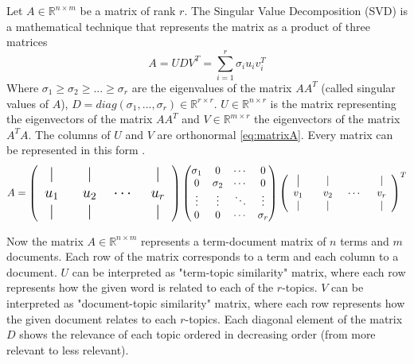 \documentclass[a4paper,11pt,DIV=15]{scrartcl} %
\theoremstyle{plain}
\theoremstyle{definition}
\begin{document}
Let $A \in \mathbb{R}^{n \times m}$ be a matrix of rank $r$. The Singular Value Decomposition (SVD) is a mathematical technique that represents the matrix as a product of three matrices
\[
A = UDV^T = \sum_{i=1}^r \sigma_i u_i v_i^T  
\]
Where $\sigma_1 \geq \sigma_2 \geq ...\geq \sigma_r$ are the eigenvalues of the matrix $AA^T$ (called singular values of $A$), $D = diag(\sigma_1,...,\sigma_r) \in \mathbb{R}^{r \times r}$. $U \in \mathbb{R}^{n \times r}$ is the matrix representing the eigenvectors of the matrix $AA^T$ and $V \in \mathbb{R}^{m \times r}$ the eigenvectors of the matrix $A^TA$. The columns of $U$ and $V$ are orthonormal \ref{eq:matrixA}. Every matrix can be represented in this form \cite{strang2005}.
\begin{equation}
    A = 
\Large
\begin{pmatrix}
    \phantom{-} \vert \phantom{-} & \phantom{-} \vert \phantom{-} & & \phantom{-} \vert \phantom{-} \\
    u_1 & u_2 & \cdots & u_r \\
    \phantom{-} \vert \phantom{-} & \phantom{-} \vert \phantom{-} & & \phantom{-} \vert \phantom{-} \\
\end{pmatrix}
\normalsize
\begin{pmatrix}
    \sigma_1 & 0 & \cdots & 0 \\
    0 & \sigma_2 & \cdots & 0 \\
    \vdots & \vdots & \ddots & \vdots \\
    0 & 0 & \cdots & \sigma_r
\end{pmatrix}
\begin{pmatrix}
    \phantom{-} \big\lvert \phantom{-} & \phantom{-} \vert \phantom{-} & & \phantom{-} \vert \phantom{-} \\
    v_1 & v_2 & \cdots & v_r \\
    \phantom{-} \vert \phantom{-} & \phantom{-} \vert \phantom{-} & & \phantom{-} \vert \phantom{-} \\
\end{pmatrix}^T
\label{eq:matrixA}
\end{equation}









Now the matrix $A \in \mathbb{R}^{n \times m}$ represents a term-document matrix of $n$ terms and $m$ documents. Each row of the matrix corresponds to a term and each column to a document. $U$ can be interpreted as "term-topic similarity" matrix, where each row represents how the given word is related to each of the $r$-topics. $V$ can be interpreted as "document-topic similarity" matrix, where each row represents how the given document relates to each $r$-topics. Each diagonal element of the matrix  $D$ shows the relevance of each topic ordered in decreasing order (from more relevant to less relevant).
\end{document}
